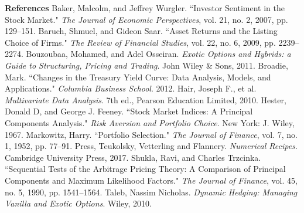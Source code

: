 \documentclass[12pt,twoside]{article}
\begin{document}
{\large \textbf{References}}
\bigbreak
Baker, Malcolm, and Jeffrey Wurgler. ``Investor Sentiment in the Stock Market." \textit{The Journal of Economic Perspectives}, vol. 21, no. 2, 2007, pp. 129–151.
\bigbreak
Baruch, Shmuel, and Gideon Saar. ``Asset Returns and the Listing Choice of Firms." \textit{The Review of Financial Studies}, vol. 22, no. 6, 2009, pp. 2239–2274.
\bigbreak
Bouzoubaa, Mohamed, and Adel Osseiran. \textit{Exotic Options and Hybrids: a Guide to Structuring, Pricing and Trading}. John Wiley \& Sons, 2011.
\bigbreak
Broadie, Mark. ``Changes in the Treasury Yield Curve: Data Analysis, Models, and Applications." \textit{Columbia Business School}. 2012.
\bigbreak
Hair, Joseph F., et al. \textit{Multivariate Data Analysis}. 7th ed., Pearson Education Limited, 2010. 
\bigbreak
Hester, Donald D, and George J. Feeney. ``Stock Market Indices: A Principal Components Analysis." \textit{Risk Aversion and Portfolio Choice}. New York: J. Wiley, 1967.
\bigbreak
Markowitz, Harry. ``Portfolio Selection." \textit{The Journal of Finance}, vol. 7, no. 1, 1952, pp. 77–91.
\bigbreak
Press, Teukolsky, Vetterling and Flannery. \textit{Numerical Recipes}. Cambridge University Press, 2017.
\bigbreak
Shukla, Ravi, and Charles Trzcinka. ``Sequential Tests of the Arbitrage Pricing Theory: A Comparison of Principal Components and Maximum Likelihood Factors." \textit{The Journal of Finance}, vol. 45, no. 5, 1990, pp. 1541–1564.
\bigbreak
Taleb, Nassim Nicholas. \textit{Dynamic Hedging: Managing Vanilla and Exotic Options}. Wiley, 2010.
\end{document}
